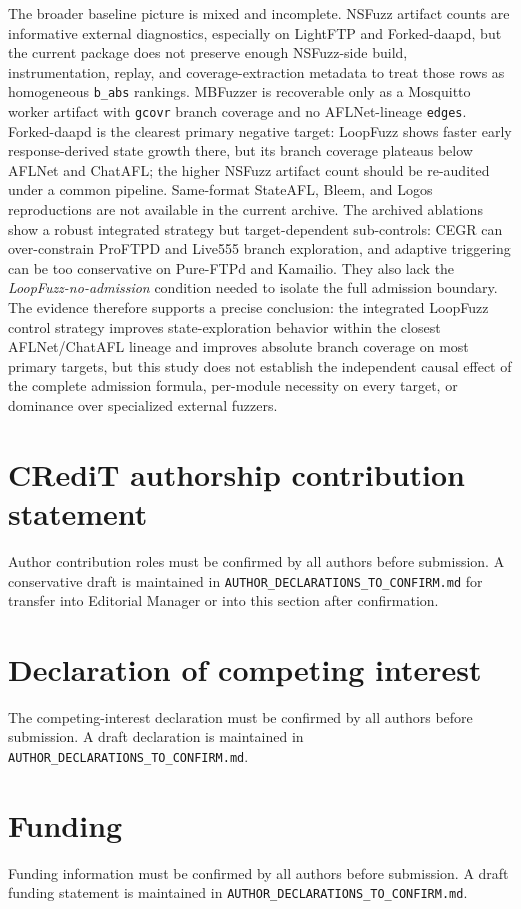 \documentclass[final,5p,times,number]{elsarticle}
\begin{document}
The broader baseline picture is mixed and incomplete. NSFuzz artifact counts are informative external diagnostics, especially on LightFTP and Forked-daapd, but the current package does not preserve enough NSFuzz-side build, instrumentation, replay, and coverage-extraction metadata to treat those rows as homogeneous \texttt{b\_abs} rankings. MBFuzzer is recoverable only as a Mosquitto worker artifact with \texttt{gcovr} branch coverage and no AFLNet-lineage \texttt{edges}. Forked-daapd is the clearest primary negative target: LoopFuzz shows faster early response-derived state growth there, but its branch coverage plateaus below AFLNet and ChatAFL; the higher NSFuzz artifact count should be re-audited under a common pipeline. Same-format StateAFL, Bleem, and Logos reproductions are not available in the current archive. The archived ablations show a robust integrated strategy but target-dependent sub-controls: CEGR can over-constrain ProFTPD and Live555 branch exploration, and adaptive triggering can be too conservative on Pure-FTPd and Kamailio. They also lack the \emph{LoopFuzz-no-admission} condition needed to isolate the full admission boundary. The evidence therefore supports a precise conclusion: the integrated LoopFuzz control strategy improves state-exploration behavior within the closest AFLNet/ChatAFL lineage and improves absolute branch coverage on most primary targets, but this study does not establish the independent causal effect of the complete admission formula, per-module necessity on every target, or dominance over specialized external fuzzers.

\section*{CRediT authorship contribution statement}
Author contribution roles must be confirmed by all authors before submission. A conservative draft is maintained in \texttt{AUTHOR\_DECLARATIONS\_TO\_CONFIRM.md} for transfer into Editorial Manager or into this section after confirmation.

\section*{Declaration of competing interest}
The competing-interest declaration must be confirmed by all authors before submission. A draft declaration is maintained in \texttt{AUTHOR\_DECLARATIONS\_TO\_CONFIRM.md}.

\section*{Funding}
Funding information must be confirmed by all authors before submission. A draft funding statement is maintained in \texttt{AUTHOR\_DECLARATIONS\_TO\_CONFIRM.md}.
\end{document}
